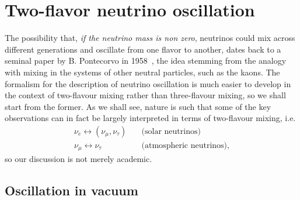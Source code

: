 \section{Two-flavor neutrino oscillation}

The possibility that, \emph{if the neutrino mass is non zero}, neutrinos could mix
across different generations and oscillate from one flavor to another, dates back to a
seminal paper by B. Pontecorvo in 1958~\cite{Pontecorvo:1957qd}, the idea stemming
from the analogy with mixing in the systems of other neutral particles, such as the
kaons.
The formalism for the description of neutrino oscillation is much easier to develop
in the context of two-flavour mixing rather than three-flavour mixing, so we shall start
from the former. As we shall see, nature is such that some of the key observations can
in fact be largely interpreted in terms of two-flavour mixing, i.e.
\begin{align*}
  \nu_e \leftrightarrow (\nu_\mu, \nu_\tau) & \quad\text{(solar neutrinos)} \\
  \nu_\mu \leftrightarrow \nu_\tau & \quad\text{(atmospheric neutrinos)},
\end{align*}
so our  discussion is not merely academic.


\subsection{Oscillation in vacuum}

